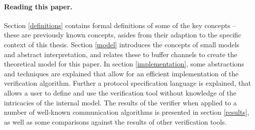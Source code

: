 \paragraph{Reading this paper.} Section \ref{definitions} contains formal definitions of some of the key concepts -- these are previously known concepts, asides from their adaption to the specific context of this thesis. Section \ref{model} introduces the concepts of small models and abstract interpretation, and relates these to buffer channels to create the theoretical model for this paper. In section \ref{implementation}, some abstractions and techniques are explained that allow for an efficient implementation of the verification algorithm. Further a protocol specification language is explained, that allows a user to define and use the verification tool without knowledge of the intricacies of the internal model. The results of the verifier when applied to a number of well-known communication algorithms is presented in section \ref{results}, as well as some comparisons against the results of other verification tools.



